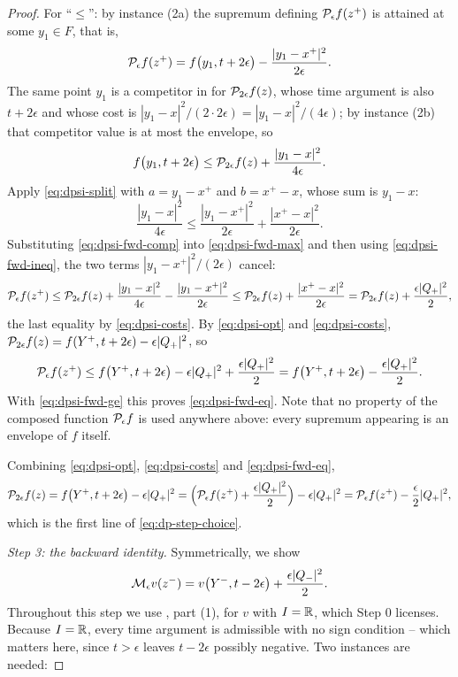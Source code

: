 \begin{proof}
For ``$\le$'': by instance (2a) the supremum defining $\mathcal{P}_\epsilon f(z^+)$ is
attained at some $y_1\in F$, that is,
\begin{equation}\label{eq:dpsi-fwd-max}
  \mathcal{P}_\epsilon f(z^+)=f\bigl(y_1,t+2\epsilon\bigr)
    -\frac{|y_1-x^+|^2}{2\epsilon}.
\end{equation}
The same point $y_1$ is a competitor in  for
$\mathcal{P}_{2\epsilon}f(z)$, whose time argument is also $t+2\epsilon$ and whose
cost is $|y_1-x|^2/(2\cdot2\epsilon)=|y_1-x|^2/(4\epsilon)$; by instance (2b)
that competitor value is at most the envelope, so
\begin{equation}\label{eq:dpsi-fwd-comp}
  f\bigl(y_1,t+2\epsilon\bigr)\le\mathcal{P}_{2\epsilon}f(z)
    +\frac{|y_1-x|^2}{4\epsilon}.
\end{equation}
Apply \eqref{eq:dpsi-split} with $a=y_1-x^+$ and $b=x^+-x$, whose sum is
$y_1-x$:
\begin{equation}\label{eq:dpsi-fwd-ineq}
  \frac{|y_1-x|^2}{4\epsilon}\le\frac{|y_1-x^+|^2}{2\epsilon}
    +\frac{|x^+-x|^2}{2\epsilon}.
\end{equation}
Substituting \eqref{eq:dpsi-fwd-comp} into \eqref{eq:dpsi-fwd-max} and then
using \eqref{eq:dpsi-fwd-ineq}, the two terms $|y_1-x^+|^2/(2\epsilon)$ cancel:
\[
  \mathcal{P}_\epsilon f(z^+)
   \le\mathcal{P}_{2\epsilon}f(z)+\frac{|y_1-x|^2}{4\epsilon}
     -\frac{|y_1-x^+|^2}{2\epsilon}
   \le\mathcal{P}_{2\epsilon}f(z)+\frac{|x^+-x|^2}{2\epsilon}
   =\mathcal{P}_{2\epsilon}f(z)+\frac{\epsilon|Q_+|^2}{2},
\]
the last equality by \eqref{eq:dpsi-costs}. By \eqref{eq:dpsi-opt} and
\eqref{eq:dpsi-costs}, $\mathcal{P}_{2\epsilon}f(z)
=f(Y^+,t+2\epsilon)-\epsilon|Q_+|^2$, so
\[
  \mathcal{P}_\epsilon f(z^+)\le f\bigl(Y^+,t+2\epsilon\bigr)-\epsilon|Q_+|^2
     +\frac{\epsilon|Q_+|^2}{2}
   =f\bigl(Y^+,t+2\epsilon\bigr)-\frac{\epsilon|Q_+|^2}{2}.
\]
With \eqref{eq:dpsi-fwd-ge} this proves \eqref{eq:dpsi-fwd-eq}. Note that no
property of the composed function $\mathcal{P}_\epsilon f$ is used anywhere above:
every supremum appearing is an envelope of $f$ itself.

Combining \eqref{eq:dpsi-opt}, \eqref{eq:dpsi-costs} and
\eqref{eq:dpsi-fwd-eq},
\[
  \mathcal{P}_{2\epsilon}f(z)=f\bigl(Y^+,t+2\epsilon\bigr)-\epsilon|Q_+|^2
   =\Bigl(\mathcal{P}_\epsilon f(z^+)+\frac{\epsilon|Q_+|^2}{2}\Bigr)
     -\epsilon|Q_+|^2
   =\mathcal{P}_\epsilon f(z^+)-\frac{\epsilon}{2}|Q_+|^2,
\]
which is the first line of \eqref{eq:dp-step-choice}.

\emph{Step 3: the backward identity.}
Symmetrically, we show
\begin{equation}\label{eq:dpsi-bwd-eq}
  \mathcal{M}_\epsilon v(z^-)=v\bigl(Y^-,t-2\epsilon\bigr)+\frac{\epsilon|Q_-|^2}{2}.
\end{equation}
Throughout this step we use , part (1), for $v$ with
$I=\mathbb{R}$, which Step 0 licenses. Because $I=\mathbb{R}$, every time argument is
admissible with no sign condition -- which matters here, since $t>\epsilon$
leaves $t-2\epsilon$ possibly negative. Two instances are needed:


\end{proof}
